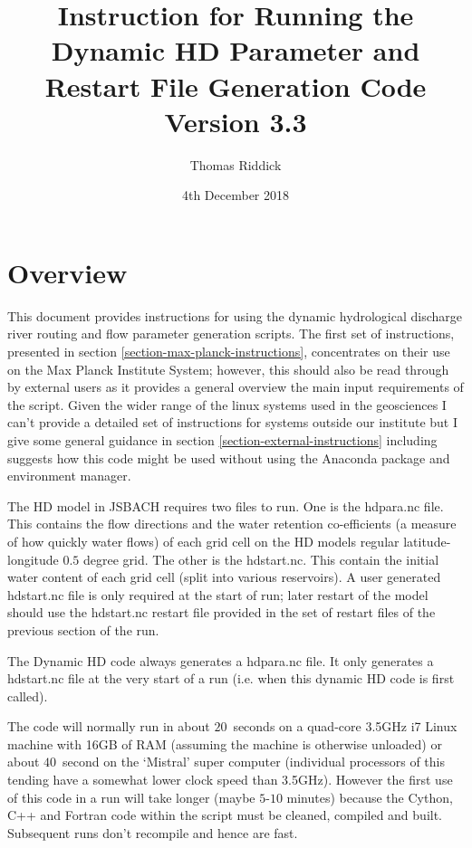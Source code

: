\documentclass{article}
\title{Instruction for Running the Dynamic HD Parameter and Restart File Generation Code Version 3.3}
\author{Thomas Riddick}
\date{4th December 2018}
\begin{document}
\lstset{language=bash}
\maketitle
\section{Overview}
This document provides instructions for using the dynamic hydrological discharge river routing and flow parameter generation scripts. The first set of instructions, presented in section \ref{section-max-planck-instructions}, concentrates on their use on the Max Planck Institute System; however, this should also be read through by external users as it provides a general overview the main input requirements of the script. Given the wider range of the linux systems used in the geosciences I can't provide a detailed set of instructions for systems outside our institute but I give some general guidance in section \ref{section-external-instructions} including suggests how this code might be used without using the Anaconda package and environment manager.

The HD model in JSBACH requires two files to run. One is the hdpara.nc file. This contains the flow directions and the water retention co-efficients (a measure of how quickly water flows) of each grid cell on the HD models regular latitude-longitude $0.5$ degree grid. The other is the hdstart.nc. This contain the initial water content of each grid cell (split into various reservoirs). A user generated hdstart.nc file is only required at the start of run; later restart of the model should use the hdstart.nc restart file provided in the set of restart files of the previous section of the run.

The Dynamic HD code always generates a hdpara.nc file. It only generates a hdstart.nc file at the very start of a run (i.e. when this dynamic HD code is first called).

The code will normally run in about $20$~seconds on a quad-core  3.5GHz i7 Linux machine with 16GB of RAM (assuming the machine is otherwise unloaded) or about $40$~second on the `Mistral' super computer (individual processors of this tending have a somewhat lower clock speed than 3.5GHz). However the first use of this code in a run will take longer (maybe $5$-$10$ minutes) because the Cython, C++ and Fortran code within the script must be cleaned, compiled and built. Subsequent runs don't recompile and hence are fast.
\end{document}
